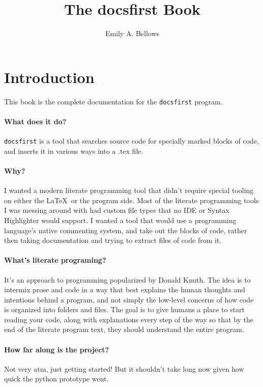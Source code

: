 \documentclass{article}
\title{The docsfirst Book}
\author{Emily A. Bellows}
\begin{document}
\maketitle

\section{Introduction}

This book is the complete documentation for the \texttt{docsfirst} program.

\paragraph{What does it do?} \texttt{docsfirst} is a tool that searches source
code for specially marked blocks of code, and inserts it in various ways
into a .tex file.

\paragraph{Why?} I wanted a modern literate programming tool that didn't require
special tooling on either the \LaTeX\ or the program side. Most of the
literate programming tools I was messing around with had custom file types that
no IDE or Syntax Highlighter would support. I wanted a tool that would use a
programming language's native commenting system, and take out the blocks of
code, rather then taking documentation and trying to extract files of code from
it.

\paragraph{What's literate programing?} It's an approach to programming
popularized by Donald Knuth. The idea is to intermix
prose and code in a way that best explains the human thoughts and intentions
behind a program, and not simply the low-level concerns of how code is organized
into folders and files. The goal is to give humans a place to start reading your
code, along with explanations every step of the way so that by the end of the
literate program text, they should understand the entire program.

\paragraph{How far along is the project?} Not very atm, just getting started!
But it shouldn't take long now given how quick the python prototype went.
\end{document}
